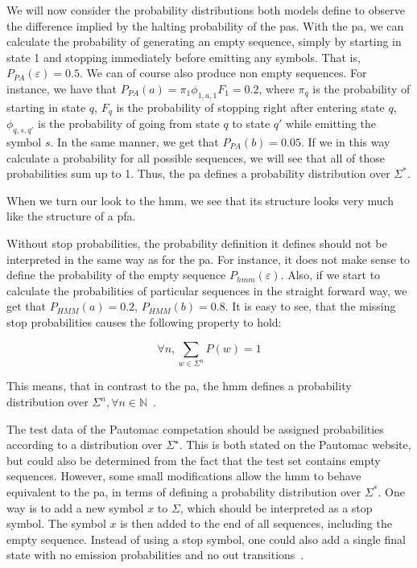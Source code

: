 We will now consider the probability distributions both models define to observe the difference implied by the halting probability of the \glspl{pa}.
With the \gls{pa}, we can calculate the probability of generating an empty sequence, simply by starting in state 1 and stopping immediately before emitting any symbols. That is, $P_{PA}(\varepsilon) = 0.5$. We can of course also produce non empty sequences. For instance, we have that $P_{PA}(a) = \pi_1\phi_{1,a,1}F_1 = 0.2$, where $\pi_q$ is the probability of starting in state $q$, $F_q$ is the probability of stopping right after entering state $q$, $\phi_{q,s,q'}$ is the probability of going from state $q$ to state $q'$ while emitting the symbol $s$.
In the same manner, we get that $P_{PA}(b) = 0.05$.
If we in this way calculate a probability for all possible sequences, we will see that all of those probabilities sum up to 1. Thus, the \gls{pa} defines a probability distribution over $\Sigma^\ast$\cite{Dupont:2005:LPA:1746577.1746601}.

When we turn our look to the \gls{hmm}, we see that its structure looks very much like the structure of a \gls{pfa}.

Without stop probabilities, the probability definition it defines should not be interpreted in the same way as for the \gls{pa}. For instance, it does not make sense to define the probability of the empty sequence $P_{hmm}(\varepsilon)$. Also, if we start to calculate the probabilities of particular sequences in the straight forward way, we get that $P_{HMM}(a) = 0.2$, $P_{HMM}(b) = 0.8$. It is easy to see, that the missing stop probabilities causes the following property to hold:

\[\forall n, \sum_{w \in \Sigma^n} P(w) = 1\]

This means, that in contrast to the \gls{pa}, the \gls{hmm} defines a probability distribution over $\Sigma^n, \forall n \in \mathbb{N}$~\cite{Dupont:2005:LPA:1746577.1746601}.

The test data of the Pautomac competation should be assigned probabilities according to a distribution over $\Sigma^\star$.
This is both stated on the Pautomac website, but could also be determined from the fact that the test set contains empty sequences. However, some small modifications allow the \gls{hmm} to behave equivalent to the \gls{pa}, in terms of defining a probability distribution over $\Sigma^\ast$. One way is to add a new symbol $x$ to $\Sigma$, which should be interpreted as a stop symbol. The symbol $x$ is then added to the end of all sequences, including the empty sequence. Instead of using a stop symbol, one could also add a single final state with no emission probabilities and no out transitions~\cite{Dupont:2005:LPA:1746577.1746601}.